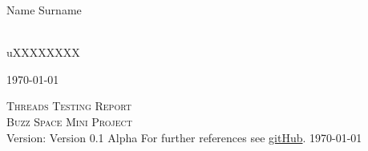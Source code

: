 \documentclass[a4paper,12pt]{report}
\begin{document}
\begin{titlepage}
\begin{center}
\begin{minipage}{0.4\textwidth}
\end{minipage}
\begin{minipage}{0.4\textwidth}
\begin{flushleft} \large
Name {Surname}
\end{flushleft}
\end{minipage}
\begin{minipage}{0.4\textwidth}
\begin{flushright} \large
\emph{} \\
uXXXXXXXX
\end{flushright}
\end{minipage}
\vfill
{\large \today}
\end{center}
\end{titlepage}
%

\renewcommand{\thesection}{\arabic{section}}
\newpage
\begin{center}
\textsc{\LARGE Threads Testing Report}\\[1.5cm]
\textsc{\Large Buzz Space Mini Project}\\[0.5cm]
Version: Version 0.1 Alpha 
For further references see \href{https://github.com/thepickpocket/ThreadsTesting}{gitHub}.
\today
\end{center}

\newpage
\tableofcontents
\pagebreak






\end{document}
